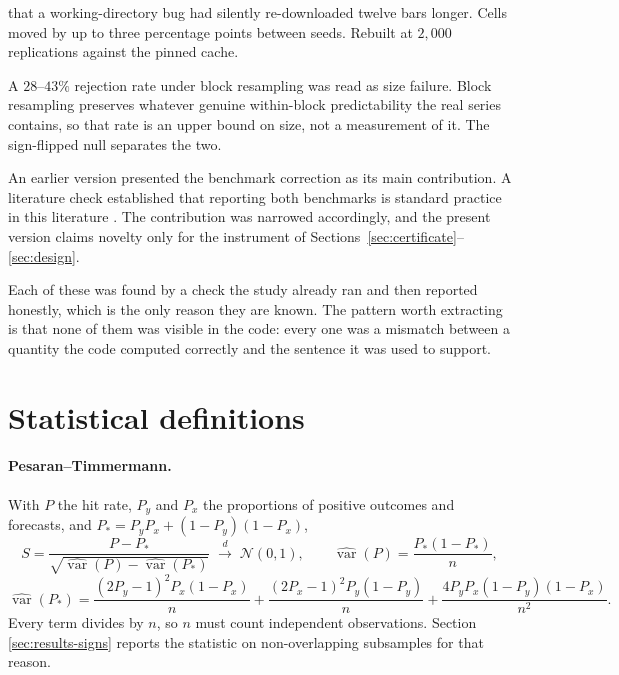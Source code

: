 \documentclass{article}
\theoremstyle{plain}
\theoremstyle{definition}
\begin{document}
\begin{description}
    that a working-directory bug had silently re-downloaded twelve bars longer. Cells moved
    by up to three percentage points between seeds. Rebuilt at $2{,}000$ replications against
    the pinned cache.
  \item[The dependence null.] A $28$--$43\%$ rejection rate under block resampling was read
    as size failure. Block resampling preserves whatever genuine within-block predictability
    the real series contains, so that rate is an upper bound on size, not a measurement of
    it. The sign-flipped null separates the two.
  \item[Novelty.] An earlier version presented the benchmark correction as its main
    contribution. A literature check established that reporting both benchmarks is standard
    practice in this literature \citep{magner2022, moosa2016, welch2008, campbell2008}. The
    contribution was narrowed accordingly, and the present version claims novelty only for
    the instrument of Sections~\ref{sec:certificate}--\ref{sec:design}.
\end{description}

Each of these was found by a check the study already ran and then reported honestly, which
is the only reason they are known. The pattern worth extracting is that none of them was
visible in the code: every one was a mismatch between a quantity the code computed correctly
and the sentence it was used to support.


\section{Statistical definitions}
\label{sec:formulas}

\paragraph{Pesaran--Timmermann.} With $P$ the hit rate, $P_y$ and $P_x$ the
proportions of positive outcomes and forecasts, and
$P_{\ast} = P_y P_x + (1-P_y)(1-P_x)$,
%
\begin{equation}
  S = \frac{P - P_{\ast}}
  {\sqrt{\widehat{\operatorname{var}}(P) - \widehat{\operatorname{var}}(P_{\ast})}}
  \;\xrightarrow{\;d\;}\; \mathcal{N}(0,1),
  \qquad
  \widehat{\operatorname{var}}(P) = \frac{P_{\ast}(1 - P_{\ast})}{n},
\end{equation}
\begin{equation}
  \widehat{\operatorname{var}}(P_{\ast}) = \frac{(2P_y-1)^2 P_x (1-P_x)}{n}
  + \frac{(2P_x-1)^2 P_y (1-P_y)}{n}
  + \frac{4 P_y P_x (1-P_y)(1-P_x)}{n^2}.
\end{equation}
%
Every term divides by $n$, so $n$ must count independent observations. Section
\ref{sec:results-signs} reports the statistic on non-overlapping subsamples for
that reason.
\end{document}
